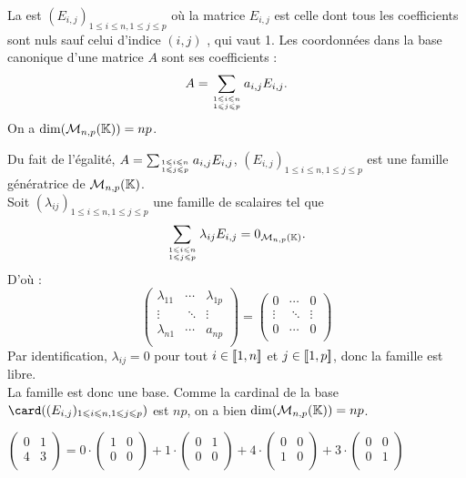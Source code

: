 \documentclass{book}
\begin{document}
\begin{Proposition}La  est $(E_{i,j})_{1\leqslant i\leqslant n, 1\leqslant j\leqslant p}$ où la matrice  $E_{i,j}$ est celle dont tous les coefficients sont nuls sauf celui d'indice $(i,j)$ , qui vaut 1. Les coordonnées dans la base canonique d'une matrice $A$ sont ses coefficients :$$ A = \sum _{1\leqslant i\leqslant n\atop 1\leqslant j\leqslant p}  a_{i,j} E_{i,j}.$$
On a $\dim( \mathcal{M}_{n,p}(\mathbb{K}))=np$.
\end{Proposition}
\begin{Demonstration}
Du fait de l'égalité, $ A = \sum _{1\leqslant i\leqslant n\atop 1\leqslant j\leqslant p}  a_{i,j} E_{i,j}$,  $(E_{i,j})_{1\leqslant i\leqslant n, 1\leqslant j\leqslant p}$ est une famille génératrice de $\mathcal{M}_{n,p}(\mathbb{K})$.\\
Soit  $(\lambda_{ij})_{1\leqslant i\leqslant n, 1\leqslant j\leqslant p}$ une famille de scalaires tel que
$$\sum _{1\leqslant i\leqslant n\atop 1\leqslant j\leqslant p}  \lambda_{ij} E_{i,j}=0_{\mathcal{M}_{n,p}(\mathbb{K})}.$$
D'où :
 $$\begin{pmatrix}
\lambda_{11} &  \cdots & \lambda_{1p}\\
\vdots & \ \ddots & \vdots\\
\lambda_{n1} &  \cdots & a_{np}\\
\end{pmatrix}= \begin{pmatrix}
0 &  \cdots &0\\
\vdots & \ \ddots & \vdots\\
0 &  \cdots & 0\\
\end{pmatrix}$$
Par identification, $\lambda_{ij}=0$ pour tout $i\in\mathopen\lbrack\!\lbrack1,n \mathclose\rbrack\!\rbrack$ et  $j\in\mathopen\lbrack\!\lbrack1,p \mathclose\rbrack\!\rbrack$, donc la famille est libre.\\
La famille est donc une base. Comme la cardinal de la base $\card((E_{i,j})_{1\leqslant i\leqslant n, 1\leqslant j\leqslant p})$ est $np$, on a bien $\dim( \mathcal{M}_{n,p}(\mathbb{K}))=np$.
\end{Demonstration}
\begin{Exemple}$ \begin{pmatrix}
0 &1  \\
4 & 3 \\
\end{pmatrix} =
0\cdot
\begin{pmatrix}
1 &0  \\
0 & 0  \\
\end{pmatrix}
+
1\cdot
\begin{pmatrix}
0 &1  \\
0 & 0 \\
\end{pmatrix}
+
4\cdot
\begin{pmatrix}
0 &0  \\
1 & 0  \\
\end{pmatrix}
+
3\cdot
\begin{pmatrix}
0 &0  \\
0 & 1  \\
\end{pmatrix}
$
\end{Exemple}
\end{document}
